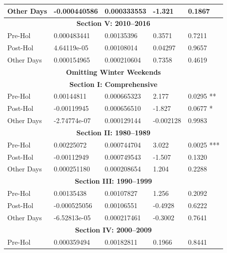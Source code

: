 \documentclass[11pt, english]{article}
\begin{document}
\begin{center}
\begin{longtable}{p{2cm}p{2cm}p{2cm}p{2cm}p{2cm}}
                Other Days & -0.000440586 & 0.000333553 & -1.321 & 0.1867\\
                \hline 
                \multicolumn{5}{c}{\textbf{Section V: 2010--2016}}\\   
                \hline            
                Pre-Hol & 0.000483441 & 0.00135396 & 0.3571 & 0.7211\\ 
                Post-Hol & 4.64119e-05 & 0.00108014 & 0.04297 & 0.9657\\  
                Other Days & 0.000154965 & 0.000210604 & 0.7358 & 0.4619\\
                \hline
                \hline
		\multicolumn{5}{c}{\textbf{Omitting Winter Weekends}}\\ 
                \hline
                \hline
                \multicolumn{5}{c}{\textbf{Section I: Comprehensive}}\\
                \hline
                Pre-Hol & 0.00144811 & 0.000665323 & 2.177 & 0.0295 **\\
                Post-Hol & -0.00119945 & 0.000656510 & -1.827 & 0.0677 *\\
                Other Days & -2.74774e-07 & 0.000129144 & -0.002128 & 0.9983\\
                \hline
                \multicolumn{5}{c}{\textbf{Section II: 1980--1989}}\\
                \hline
                Pre-Hol & 0.00225072 & 0.000744704 & 3.022 & 0.0025 ***\\
                Post-Hol & -0.00112949 & 0.000749543 & -1.507 & 0.1320\\  
                Other Days & 0.000251180 & 0.000208654 & 1.204 & 0.2288\\
                \hline 
                \multicolumn{5}{c}{\textbf{Section III: 1990--1999}}\\   
                \hline            
                Pre-Hol & 0.00135438 & 0.00107827 & 1.256 & 0.2092\\ 
                Post-Hol & -0.000525056 & 0.00106551 & -0.4928 & 0.6222\\  
                Other Days & -6.52813e-05 & 0.000217461 & -0.3002 & 0.7641\\
                \hline 
                \multicolumn{5}{c}{\textbf{Section IV: 2000--2009}}\\
                \hline                                          
                Pre-Hol & 0.000359494 & 0.00182811 & 0.1966 & 0.8441\\

\end{longtable}
\end{center}
\end{document}
